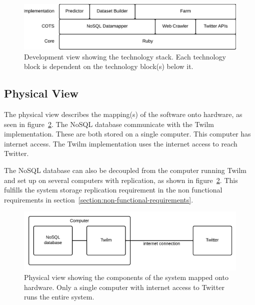 \begin{figure}[H]
\centerline{\includegraphics[width=4.5in]{image/architecture-development-view.png}}
\caption{Development view showing the technology stack. Each technology block is dependent on the technology block(s) below it.}
\label{figure:development-view}
\end{figure}

\subsection{Physical View}
The physical view describes the mapping(s) of the software onto hardware, as seen in figure~\ref{figure:development-view}. The NoSQL database communicate with the Twilm implementation. These are both stored on a single computer. This computer has internet access. The Twilm implementation uses the internet access to reach Twitter.

The NoSQL database can also be decoupled from the computer running Twilm and set up on several computers with replication, as shown in figure~\ref{figure:development-view}. This fulfills the system storage replication requirement in the non functional requirements in section~\ref{section:non-functional-requirements}.

\begin{figure}[H]
\centerline{\includegraphics[width=4.5in]{image/architecture-physical-view.png}}
\caption{Physical view showing the components of the system mapped onto hardware. Only a single computer with internet access to Twitter runs the entire system.}
\label{figure:development-view}
\end{figure}

